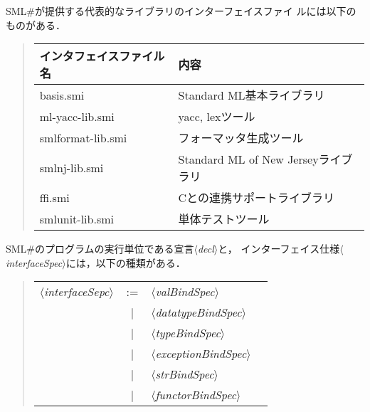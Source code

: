 \documentclass{jbook}
\newcommand{\smlsharp}{SML\#}
\newcommand{\vbar}{\mbox{\ $|$\ }}
\newcommand{\nonterm}[1]{\mbox{$\langle$}{\it #1}\mbox{$\rangle$}}
\begin{document}
	\smlsharp{}が提供する代表的なライブラリのインターフェイスファイ
ルには以下のものがある．

\begin{quote}
\begin{tabular}{|l|l|}
\hline
インタフェイスファイル名 & 内容
\\\hline
\hline
basis.smi & Standard ML基本ライブラリ\\
ml-yacc-lib.smi & yacc, lexツール\\
smlformat-lib.smi & フォーマッタ生成ツール\\
smlnj-lib.smi & Standard ML of New Jerseyライブラリ\\
ffi.smi & Cとの連携サポートライブラリ\\
smlunit-lib.smi & 単体テストツール
\\\hline
\end{tabular}
\end{quote}

	\smlsharp{}のプログラムの実行単位である宣言\nonterm{decl}と，
インターフェイス仕様\nonterm{interfaceSpec}には，以下の種類がある．

\begin{quote}
\begin{tabular}[t]{lcll}
\nonterm{interfaceSepc} &:=& \nonterm{valBindSpec}
\\&\vbar& \nonterm{datatypeBindSpec}
\\&\vbar& \nonterm{typeBindSpec}
\\&\vbar& \nonterm{exceptionBindSpec}
\\&\vbar& \nonterm{strBindSpec}
\\&\vbar& \nonterm{functorBindSpec}
\end{tabular}
\end{quote}
	
\end{document}
